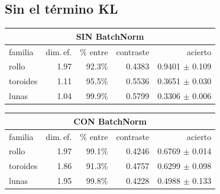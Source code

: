 \documentclass[11pt,a4paper]{article}
\begin{document}
\subsection*{Sin el término KL}
\noindent
\begin{minipage}[t]{0.49\textwidth}
  \centering
  \footnotesize\setlength{\tabcolsep}{3pt}
  \begin{tabular}{lrrrr}
      \multicolumn{5}{c}{\textbf{SIN BatchNorm}} \\[2pt]
      \toprule
      familia & dim.\,ef. & \% entre & contraste & acierto \\
      \midrule
      rollo & 1.97 & 92.3\% & 0.4383 & 0.9401 $\pm$ 0.109 \\
      toroides & 1.11 & 95.5\% & 0.5536 & 0.3651 $\pm$ 0.030 \\
      lunas & 1.04 & 99.9\% & 0.5799 & 0.3306 $\pm$ 0.006 \\
      \bottomrule
    \end{tabular}
\end{minipage}\hfill
\begin{minipage}[t]{0.49\textwidth}
  \centering
  \footnotesize\setlength{\tabcolsep}{3pt}
  \begin{tabular}{lrrrr}
      \multicolumn{5}{c}{\textbf{CON BatchNorm}} \\[2pt]
      \toprule
      familia & dim.\,ef. & \% entre & contraste & acierto \\
      \midrule
      rollo & 1.97 & 99.1\% & 0.4246 & 0.6769 $\pm$ 0.014 \\
      toroides & 1.86 & 91.3\% & 0.4757 & 0.6299 $\pm$ 0.098 \\
      lunas & 1.95 & 99.8\% & 0.4228 & 0.4988 $\pm$ 0.133 \\
      \bottomrule
    \end{tabular}
\end{minipage}
\vspace{11pt}
\end{document}
